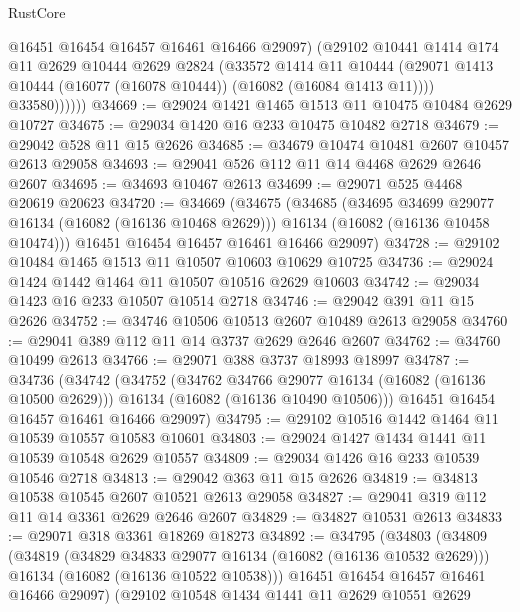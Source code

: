 \begin{lexlean}{RustCore}
\begin{coremodule}
                @16451
                @16454
                @16457
                @16461
                @16466
                @29097)
              (@29102
                @10441
                @1414
                @174
                @11
                @2629
                @10444
                @2629
                @2824
                (@33572
                  @1414
                  @11
                  @10444
                  (@29071 @1413 @10444 (@16077 (@16078 @10444)) (@16082 (@16084 @1413 @11))))
                @33580))))))
@34669 := @29024 @1421 @1465 @1513 @11 @10475 @10484 @2629 @10727
@34675 := @29034 @1420 @16 @233 @10475 @10482 @2718
@34679 := @29042 @528 @11 @15 @2626
@34685 := @34679 @10474 @10481 @2607 @10457 @2613 @29058
@34693 := @29041 @526 @112 @11 @14 @4468 @2629 @2646 @2607
@34695 := @34693 @10467 @2613
@34699 := @29071 @525 @4468 @20619 @20623
@34720 := @34669
    (@34675
      (@34685
        (@34695 @34699 @29077 @16134 (@16082 (@16136 @10468 @2629)))
        @16134
        (@16082 (@16136 @10458 @10474)))
      @16451
      @16454
      @16457
      @16461
      @16466
      @29097)
@34728 := @29102 @10484 @1465 @1513 @11 @10507 @10603 @10629 @10725
@34736 := @29024 @1424 @1442 @1464 @11 @10507 @10516 @2629 @10603
@34742 := @29034 @1423 @16 @233 @10507 @10514 @2718
@34746 := @29042 @391 @11 @15 @2626
@34752 := @34746 @10506 @10513 @2607 @10489 @2613 @29058
@34760 := @29041 @389 @112 @11 @14 @3737 @2629 @2646 @2607
@34762 := @34760 @10499 @2613
@34766 := @29071 @388 @3737 @18993 @18997
@34787 := @34736
    (@34742
      (@34752
        (@34762 @34766 @29077 @16134 (@16082 (@16136 @10500 @2629)))
        @16134
        (@16082 (@16136 @10490 @10506)))
      @16451
      @16454
      @16457
      @16461
      @16466
      @29097)
@34795 := @29102 @10516 @1442 @1464 @11 @10539 @10557 @10583 @10601
@34803 := @29024 @1427 @1434 @1441 @11 @10539 @10548 @2629 @10557
@34809 := @29034 @1426 @16 @233 @10539 @10546 @2718
@34813 := @29042 @363 @11 @15 @2626
@34819 := @34813 @10538 @10545 @2607 @10521 @2613 @29058
@34827 := @29041 @319 @112 @11 @14 @3361 @2629 @2646 @2607
@34829 := @34827 @10531 @2613
@34833 := @29071 @318 @3361 @18269 @18273
@34892 := @34795
    (@34803
      (@34809
        (@34819
          (@34829 @34833 @29077 @16134 (@16082 (@16136 @10532 @2629)))
          @16134
          (@16082 (@16136 @10522 @10538)))
        @16451
        @16454
        @16457
        @16461
        @16466
        @29097)
      (@29102
        @10548
        @1434
        @1441
        @11
        @2629
        @10551
        @2629

\end{coremodule}
\end{lexlean}
